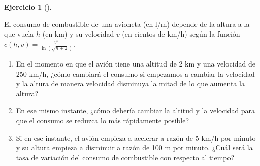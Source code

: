 \documentclass[
  spanish,
  a4paper,
]{scrreport}
\theoremstyle{definition}
\newtheorem{exercise}{Ejercicio}[chapter]
\theoremstyle{remark}
\begin{document}
\begin{exercise}[]\protect\hypertarget{exr-3}{}\label{exr-3}

El consumo de combustible de una avioneta (en l/m) depende de la altura
a la que vuela \(h\) (en km) y su velocidad \(v\) (en cientos de km/h)
según la función \(c(h,v) = \frac{v^2}{\ln(\sqrt{h+2})}\).

\begin{enumerate}
\def\labelenumi{\alph{enumi}.}
\item
  En el momento en que el avión tiene una altitud de 2 km y una
  velocidad de 250 km/h, ¿cómo cambiará el consumo si empezamos a
  cambiar la velocidad y la altura de manera velocidad disminuya la
  mitad de lo que aumenta la altura?
\item
  En ese mismo instante, ¿cómo debería cambiar la altitud y la velocidad
  para que el consumo se reduzca lo más rápidamente posible?
\item
  Si en ese instante, el avión empieza a acelerar a razón de 5 km/h por
  minuto y su altura empieza a disminuir a razón de 100 m por minuto.
  ¿Cuál será la tasa de variación del consumo de combustible con
  respecto al tiempo?
\end{enumerate}

\end{exercise}
\end{document}
